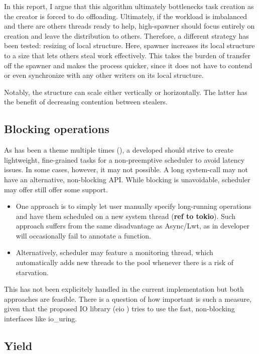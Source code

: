 \documentclass[12pt,a4paper,twoside]{report}
\begin{document}
In this report, I argue that this algorithm ultimately bottlenecks task creation as the creator is forced to do offloading. Ultimately, if the workload is imbalanced and there are others threads ready to help, high-spawner should focus entirely on creation and leave the distribution to others. Therefore, a different strategy has been tested: resizing of local structure. Here, spawner increases its local structure to a size that lets others steal work effectively. This takes the burden of transfer off the spawner and makes the process quicker, since it does not have to contend or even synchronize with any other writers on its local structure. 


Notably, the structure can scale either vertically or horizontally. The latter has the benefit of decreasing contention between stealers.  


\subsection{Blocking operations}
As has been a theme multiple times (), a developed should strive to create lightweight, fine-grained tasks for a non-preemptive scheduler to avoid latency issues. In some cases, however, it may not possible. A long system-call may not have an alternative, non-blocking API. While blocking is unavoidable, scheduler may offer still offer some support.
\begin{itemize}
    \item One approach is to simply let user manually specify long-running operations and have them scheduled on a new system thread (\textbf{ref to tokio}). Such approach suffers from the same disadvantage as Async/Lwt, as in developer will occasionally fail to annotate a function.
    \item Alternatively, scheduler may feature a monitoring thread, which automatically adds new threads to the pool whenever there is a risk of starvation.  
\end{itemize}

This has not been explicitely handled in the current implementation but both approaches are feasible. There is a question of how important is such a measure, given that the proposed IO library (eio ) tries to use the fast, non-blocking interfaces like io\_uring.

\subsection{Yield}
\label{section:yield}
\end{document}
